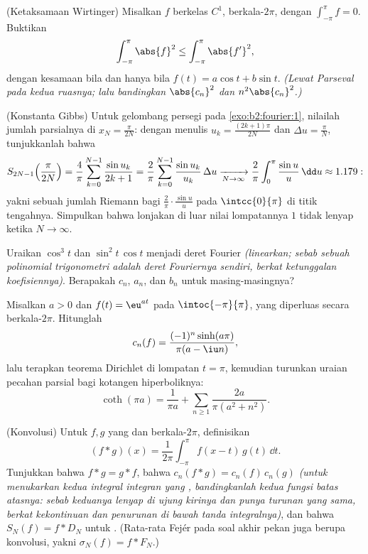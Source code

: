 \begin{exercise}[$\star\star\star$]\label{exo:b2:fourier:7}
(Ketaksamaan Wirtinger) Misalkan $f$ berkelas $C^1$, berkala-$2\pi$, dengan
$\int_{-\pi}^{\pi} f = 0$. Buktikan
\[
\int_{-\pi}^{\pi} \abs{f}^2 \leq \int_{-\pi}^{\pi} \abs{f'}^2 ,
\]
dengan kesamaan bila dan hanya bila $f(t) = a\cos t + b\sin t$. \emph{(Lewat Parseval pada
kedua ruasnya; lalu bandingkan $\abs{c_n}^2$ dan $n^2\abs{c_n}^2$.)}
\end{exercise}

\begin{exercise}[$\star\star\star$]\label{exo:b2:fourier:8}
(Konstanta Gibbs) Untuk gelombang persegi pada
\cref{exo:b2:fourier:1}, nilailah jumlah parsialnya di $x_N =
\frac{\pi}{2N}$: dengan menulis $u_k = \frac{(2k+1)\pi}{2N}$ dan $\Delta u
= \frac{\pi}{N}$, tunjukkanlah bahwa
\[
S_{2N-1}\Bigl(\frac{\pi}{2N}\Bigr)
= \frac{4}{\pi}\sum_{k=0}^{N-1} \frac{\sin u_k}{2k+1}
= \frac{2}{\pi}\sum_{k=0}^{N-1} \frac{\sin u_k}{u_k}\,\Delta u
\xrightarrow[N\to\infty]{}
\frac{2}{\pi}\int_0^{\pi}\frac{\sin u}{u}\,\dd u \approx 1.179 :
\]
yakni sebuah jumlah Riemann bagi $\frac{2}{\pi}\cdot\frac{\sin u}{u}$ pada
$\intcc{0}{\pi}$ di titik tengahnya. Simpulkan bahwa lonjakan di luar
nilai lompatannya $1$ tidak lenyap ketika $N \to \infty$.
\end{exercise}

\begin{exercise}[$\star$]\label{exo:b2:fourier:9}
Uraikan $\cos^3 t$ dan $\sin^2 t\,\cos t$ menjadi deret Fourier
\emph{(linearkan; sebab sebuah polinomial trigonometri adalah deret Fouriernya
sendiri, berkat ketunggalan koefisiennya)}. Berapakah $c_n$,
$a_n$, dan $b_n$ untuk masing-masingnya?
\end{exercise}

\begin{exercise}[$\star\star$]\label{exo:b2:fourier:10}
Misalkan $a > 0$ dan $f(t) = \eu^{at}$ pada $\intoc{-\pi}{\pi}$, yang
diperluas secara berkala-$2\pi$. Hitunglah
\[
c_n(f) = \frac{(-1)^n\sinh(a\pi)}{\pi(a - \iu n)} ,
\]
lalu terapkan teorema Dirichlet di lompatan $t = \pi$, kemudian turunkan
uraian pecahan parsial bagi kotangen hiperboliknya:
\[
\coth(\pi a) = \frac{1}{\pi a} + \sum_{n\geq1}
\frac{2a}{\pi(a^2 + n^2)} .
\]
\end{exercise}

\begin{exercise}[$\star\star$]\label{exo:b2:fourier:11}
(Konvolusi) Untuk $f, g$ yang  dan berkala-$2\pi$, definisikan
\[
(f * g)(x) = \frac{1}{2\pi}\int_{-\pi}^{\pi} f(x - t)\,g(t)\,
\dd t .
\]
Tunjukkan bahwa $f * g = g * f$, bahwa $c_n(f*g) = c_n(f)\,c_n(g)$
\emph{(untuk menukarkan kedua integral integran yang ,
bandingkanlah kedua fungsi batas atasnya: sebab keduanya lenyap di
ujung kirinya dan punya turunan yang sama, berkat kekontinuan dan
penurunan di bawah tanda integralnya)}, dan bahwa $S_N(f) =
f * D_N$ untuk . (Rata-rata Fejér pada soal akhir
pekan juga berupa konvolusi, yakni $\sigma_N(f) = f *
F_N$.)
\end{exercise}


